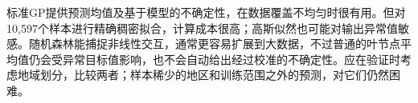 标准GP提供预测均值及基于模型的不确定性，在数据覆盖不均匀时很有用。但对10,597个样本进行精确稠密拟合，计算成本很高；高斯似然也可能对输出异常值敏感。随机森林能捕捉非线性交互，通常更容易扩展到大数据，不过普通的叶节点平均值仍会受异常目标值影响，也不会自动给出经过校准的不确定性。应在验证时考虑地域划分，比较两者；样本稀少的地区和训练范围之外的预测，对它们仍然困难。
